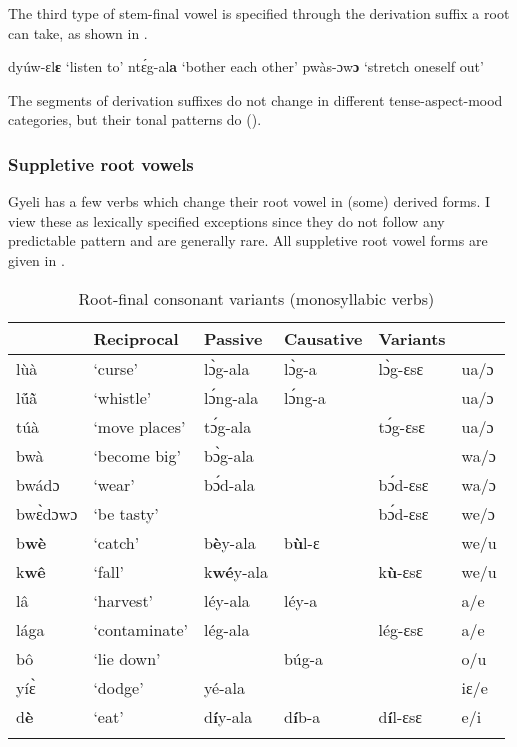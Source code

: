 The third type of stem-final vowel is specified through the derivation suffix a root can take, as shown in .

\ea \label{Vroot7}
  \ea  dyúw-ɛl{\bfseries ɛ} `listen to'
\ex ntɛ́g-al{\bfseries a} `bother each other'
\ex pwàs-ɔw{\bfseries ɔ} `stretch oneself out'
\z
\z

\noindent The segments of derivation suffixes do not change in different tense-aspect-mood categories, but their tonal patterns do ().






\subsubsection{Suppletive root vowels}
\label{sec:SRV}

Gyeli has a few verbs which change their root vowel in (some) derived forms. I view these as lexically specified exceptions since they do not follow any predictable pattern and are generally rare. All suppletive root vowel forms are given in .


\begin{table}
\begin{tabularx}{\textwidth}{l@{~}X llX l@{~}}
\lsptoprule
\multicolumn{2}{c}{Underived form}  & Reciprocal         & Passive & Causative  & Variants \\
 \midrule
lùà 	& `curse' &  lɔ̀g-ala &  lɔ̀g-a & lɔ̀g-ɛsɛ	&  		ua/ɔ \\
lṹã̀		& `whistle' &  lɔ́ng-ala &  lɔ́ng-a & 	&  	ua/ɔ \\
túà		& `move places' & tɔ́g-ala		&  & tɔ́g-ɛsɛ &  ua/ɔ \\ 		
bwà 		& `become big' &  bɔ̀g-ala &  & 		& 			wa/ɔ	 \\
bwádɔ 	&  `wear' &  bɔ́d-ala &   & bɔ́d-ɛsɛ 	&  		wa/ɔ	\\
bwɛ̀dɔwɔ	& `be tasty' &   & 		& bɔ́d-ɛsɛ	& 		we/ɔ  \\
\tablevspace
b{\bfseries wè}		& `catch' & b{\bfseries è}y-ala & 	b{\bfseries ù}l-ɛ	& 		&   we/u  \\
k{\bfseries wê} 		& `fall' 	&  k{\bfseries wé}y-ala & 		&  k{\bfseries ù}-ɛsɛ  & 	 we/u \\
lâ		& `harvest' & léy-ala		& léy-a &  &  a/e \\ 
lága		& `contaminate' & lég-ala	 &  & lég-ɛsɛ  &  a/e \\ 
bô 		& `lie down'                 &          & búg-a 	       & 	& 		 o/u \\
yíɛ̀ 		& `dodge' 	& yé-ala &  &   & 		iɛ/e \\
d{\bfseries è}		& `eat' &  d{\bfseries í}y-ala & d{\bfseries í}b-a	& 	d{\bfseries í}l-ɛsɛ	&    e/i  \\
 \lspbottomrule
\end{tabularx}
\caption{Root-final consonant variants (monosyllabic verbs)}
\label{Tab:SupplRV}
\end{table} 

